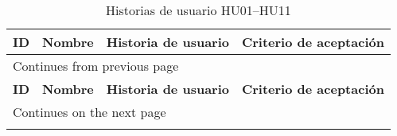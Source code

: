 \renewcommand{\arraystretch}{1.3}
\begin{longtable}{ p{1cm}  p{2.3cm}  p{5cm}  p{5cm} }
\caption{Historias de usuario HU01–HU11} \label{tab:historias-usuario} \\
\toprule
\textbf{ID} & \textbf{Nombre} & \textbf{Historia de usuario} & \textbf{Criterio de aceptación} \\
\toprule
\endfirsthead

\multicolumn{3}{l}{\footnotesize Continues from previous page} \\
\toprule
\textbf{ID} & \textbf{Nombre} & \textbf{Historia de usuario} & \textbf{Criterio de aceptación} \\
\midrule
\endhead


\bottomrule
\multicolumn{3}{l}{\footnotesize Continues on the next page} \\
\endfoot

\bottomrule
\endlastfoot


\end{longtable}
